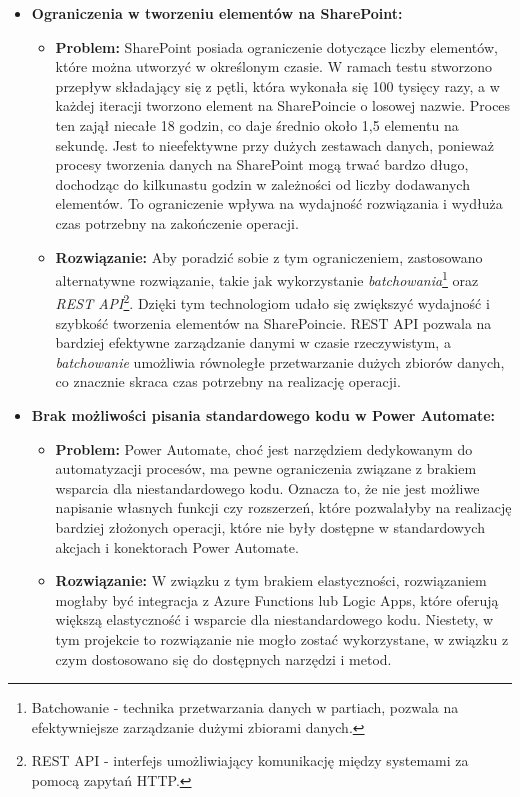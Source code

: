 \begin{itemize}
      \item \textbf{Ograniczenia w tworzeniu elementów na SharePoint:}
            \begin{itemize}
                  \item \textbf{Problem:} SharePoint posiada ograniczenie dotyczące liczby elementów, które można utworzyć w określonym czasie. W ramach testu stworzono przepływ składający się z pętli, która wykonała się 100 tysięcy razy, a w każdej iteracji tworzono element na SharePoincie o losowej nazwie. Proces ten zajął niecałe 18 godzin, co daje średnio około 1,5 elementu na sekundę. Jest to nieefektywne przy dużych zestawach danych, ponieważ procesy tworzenia danych na SharePoint mogą trwać bardzo długo, dochodząc do kilkunastu godzin w zależności od liczby dodawanych elementów. To ograniczenie wpływa na wydajność rozwiązania i wydłuża czas potrzebny na zakończenie operacji.
                  \item \textbf{Rozwiązanie:} Aby poradzić sobie z tym ograniczeniem, zastosowano alternatywne rozwiązanie, takie jak wykorzystanie \emph{batchowania}\footnote{Batchowanie - technika przetwarzania danych w partiach, pozwala na efektywniejsze zarządzanie dużymi zbiorami danych.} oraz \emph{REST API}\footnote{REST API - interfejs umożliwiający komunikację między systemami za pomocą zapytań HTTP.}. Dzięki tym technologiom udało się zwiększyć wydajność i szybkość tworzenia elementów na SharePoincie. REST API pozwala na bardziej efektywne zarządzanie danymi w czasie rzeczywistym, a \emph{batchowanie} umożliwia równoległe przetwarzanie dużych zbiorów danych, co znacznie skraca czas potrzebny na realizację operacji.
            \end{itemize}

      \item \textbf{Brak możliwości pisania standardowego kodu w Power Automate:}
            \begin{itemize}
                  \item \textbf{Problem:} Power Automate, choć jest narzędziem dedykowanym do automatyzacji procesów, ma pewne ograniczenia związane z brakiem wsparcia dla niestandardowego kodu. Oznacza to, że nie jest możliwe napisanie własnych funkcji czy rozszerzeń, które pozwalałyby na realizację bardziej złożonych operacji, które nie były dostępne w standardowych akcjach i konektorach Power Automate.
                  \item \textbf{Rozwiązanie:} W związku z tym brakiem elastyczności, rozwiązaniem mogłaby być integracja z Azure Functions lub Logic Apps, które oferują większą elastyczność i wsparcie dla niestandardowego kodu. Niestety, w tym projekcie to rozwiązanie nie mogło zostać wykorzystane, w związku z czym dostosowano się do dostępnych narzędzi i metod.
            \end{itemize}


\end{itemize}
